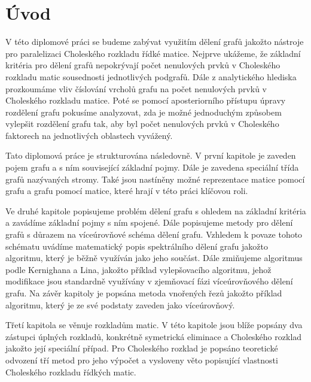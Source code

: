 \documentclass[11pt,american,czech,oneside]{book}
\theoremstyle{plain}
\theoremstyle{definition}
\begin{document}
\chapter*{Úvod}

V této diplomové práci se budeme zabývat využitím dělení grafů jakožto nástroje pro paralelizaci Choleského rozkladu řídké matice. Nejprve ukážeme, že základní kritéria pro dělení grafů nepokrývají počet nenulových prvků v Choleského rozkladu matic sousednosti jednotlivých podgrafů. Dále z analytického hlediska prozkoumáme vliv číslování vrcholů grafu na počet nenulových prvků v Choleského rozkladu matice.  Poté se pomocí aposteriorního přístupu úpravy rozdělení grafu pokusíme analyzovat, zda je možné jednoduchým způsobem vylepšit rozdělení grafu tak, aby byl počet nenulových prvků v Choleského faktorech na jednotlivých oblastech vyvážený.

Tato diplomová práce je strukturována následovně. V první kapitole je zaveden pojem grafu a s ním související základní pojmy. Dále je zavedena speciální třída grafů nazývaných stromy. Také jsou nastíněny možné reprezentace matice pomocí grafu a grafu pomocí matice, které hrají v této práci klíčovou roli.

Ve druhé kapitole popisujeme problém dělení grafu s ohledem na základní kritéria a zavádíme základní pojmy s ním spojené. Dále popisujeme metody pro dělení grafů s důrazem na víceúrovňové schéma dělení grafu. Vzhledem k povaze tohoto schématu uvádíme matematický popis spektrálního dělení grafu jakožto algoritmu, který je běžně využíván jako jeho součást. Dále zmiňujeme algoritmus podle Kernighana a Lina, jakožto příklad vylepšovacího algoritmu, jehož modifikace jsou standardně využívány v zjemňovací fázi víceúrovňového dělení grafu. Na závěr kapitoly je popsána metoda vnořených řezů jakožto příklad algoritmu, který je ze své podstaty zaveden jako víceúrovňový.

Třetí kapitola se věnuje rozkladům matic. V této kapitole jsou blíže popsány dva zástupci úplných rozkladů, konkrétně symetrická eliminace a Choleského rozklad jakožto její speciální případ. Pro Choleského rozklad je popsáno teoretické odvození tří metod pro jeho výpočet a vysloveny věto popisující vlastnosti Choleského rozkladu řídkých matic.
\end{document}
